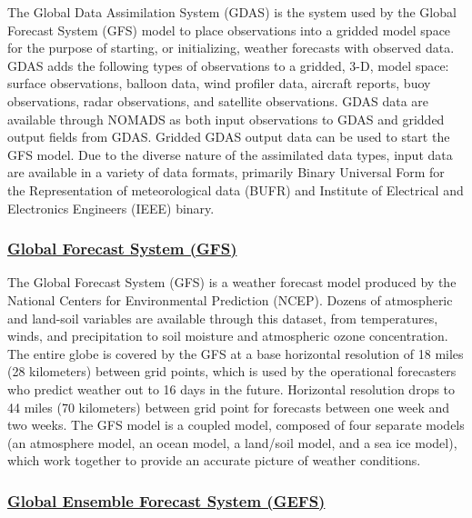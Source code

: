 \documentclass[11pt]{article}
\begin{document}
The Global Data Assimilation System (GDAS) is the system used by
the Global Forecast System (GFS) model to place observations into
a gridded model space for the purpose of starting, or
initializing, weather forecasts with observed data. GDAS adds the
following types of observations to a gridded, 3-D, model space:
surface observations, balloon data, wind profiler data, aircraft
reports, buoy observations, radar observations, and satellite
observations. GDAS data are available through NOMADS as both input
observations to GDAS and gridded output fields from GDAS. Gridded
GDAS output data can be used to start the GFS model. Due to the
diverse nature of the assimilated data types, input data are
available in a variety of data formats, primarily Binary Universal
Form for the Representation of meteorological data (BUFR) and
Institute of Electrical and Electronics Engineers (IEEE) binary.
\subsubsection{\href{http://www.emc.ncep.noaa.gov/index.php?branch=GFS}{Global Forecast System (GFS)}}
\label{sec-2-1-2}

The Global Forecast System (GFS) is a weather forecast model
produced by the National Centers for Environmental Prediction
(NCEP). Dozens of atmospheric and land-soil variables are
available through this dataset, from temperatures, winds, and
precipitation to soil moisture and atmospheric ozone
concentration. The entire globe is covered by the GFS at a base
horizontal resolution of 18 miles (28 kilometers) between grid
points, which is used by the operational forecasters who predict
weather out to 16 days in the future. Horizontal resolution drops
to 44 miles (70 kilometers) between grid point for forecasts
between one week and two weeks. The GFS model is a coupled model,
composed of four separate models (an atmosphere model, an ocean
model, a land/soil model, and a sea ice model), which work
together to provide an accurate picture of weather conditions.
\subsubsection{\href{http://www.ncdc.noaa.gov/model-data/global-ensemble-forecast-system-gefs}{Global Ensemble Forecast System (GEFS)}}
\label{sec-2-1-3}
\end{document}
